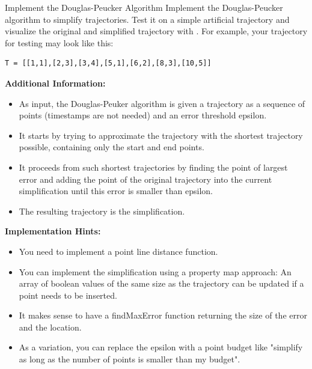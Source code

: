 \documentclass[twoside]{article}
\begin{document}
\begin{task}{Implement the Douglas-Peucker Algorithm}{}{}
Implement the Douglas-Peucker algorithm to simplify trajectories.
Test it on a simple artificial trajectory and visualize the original and simplified trajectory with . For example, your trajectory for testing may look like this:
\begin{lstlisting}[numbers=none]
T = [[1,1],[2,3],[3,4],[5,1],[6,2],[8,3],[10,5]]
\end{lstlisting}

\vspace{10pt}

\textbf{Additional Information:}
\begin{itemize}
    \item As input, the Douglas-Peuker algorithm is given a trajectory as a sequence of points (timestamps are not needed) and an error threshold epsilon. 
    \item It starts by trying to approximate the trajectory with the shortest trajectory possible, containing only the start and end points. 
    \item It proceeds from such shortest trajectories by finding the point of largest error and adding the point of the original trajectory into the current simplification until this error is smaller than epsilon.
    \item The resulting trajectory is the simplification.
\end{itemize}


\textbf{Implementation Hints:}
\begin{itemize}
    \item You need to implement a point line distance function.
    \item You can implement the simplification using a property map approach: An array of boolean values of the same size as the trajectory can be updated if a point needs to be inserted.
    \item It makes sense to have a findMaxError function returning the size of the error and the location.
    \item As a variation, you can replace the epsilon with a point budget like "simplify as long as the number of points is smaller than my budget".
\end{itemize}

\end{task}
\end{document}
